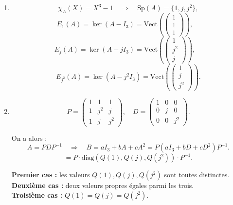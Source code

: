 \documentclass[a4paper,12pt,oneside]{book}
\newenvironment{solution}{\begin{solutionbox}}{\end{solutionbox}}
\begin{document}
	\begin{solution}
		\begin{enumerate}
			\item \[
			\chi_A(X) = X^3 - 1 \quad \Rightarrow \quad \mathrm{Sp}(A) = \{1, j, j^2\},
			\]
			\[
			E_1(A) = \ker(A - I_3) = \mathrm{Vect}\left(\begin{pmatrix}1 \\ 1 \\ 1\end{pmatrix}\right), \quad
			\]
			\[E_j(A) = \ker(A - jI_3) = \mathrm{Vect}\left(\begin{pmatrix}1 \\ j^2 \\ j\end{pmatrix}\right), \quad
			\]
			\[E_{j^2}(A) = \ker(A - j^2 I_3) = \mathrm{Vect}\left(\begin{pmatrix}1 \\ j \\ j^2\end{pmatrix}\right).
			\]
			
			\item 
			\[
			P = \begin{pmatrix}
				1 & 1 & 1 \\
				1 & j^2 & j \\
				1 & j & j^2
			\end{pmatrix}, \quad
			D = \begin{pmatrix}
				1 & 0 & 0 \\
				0 & j & 0 \\
				0 & 0 & j^2
			\end{pmatrix}.
			\]
			
			On a alors :
			\[
			A = PDP^{-1} \quad \Rightarrow \quad B = aI_3 + bA + cA^2 = P(aI_3 + bD + cD^2)P^{-1}.
			\]
			\[
			  = P \cdot \mathrm{diag}(Q(1), Q(j), Q(j^2)) \cdot P^{-1}.
			\]
			
			\textbf{Premier cas :} les valeurs \(Q(1), Q(j), Q(j^2)\) sont toutes distinctes.\\
		
			\textbf{Deuxième cas :} deux valeurs propres égales parmi les trois.\\
		
			\textbf{Troisième cas :} \(Q(1) = Q(j) = Q(j^2)\).\\
		
		\end{enumerate}
	\end{solution}
	
\end{document}
